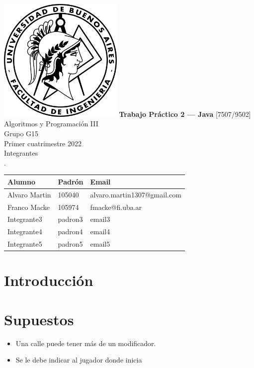 \documentclass[titlepage,a4paper]{article}
\begin{document}
\begin{titlepage} %
	\hfill\includegraphics[width=6cm]{logofiuba.jpg}
    \centering
    \vfill
    \Huge \textbf{Trabajo Práctico 2 — Java}
    \vskip2cm
    \Large [7507/9502] Algoritmos y Programación III\\
    Grupo G15 \\
    Primer cuatrimestre 2022 \\
    \vfill
    Integrantes \\
    .\\
    \begin{tabular}{ | l | l | l | } %
      \hline
      Alumno & Padrón & Email \\ \hline
      Alvaro Martin & 105040 & alvaro.martin1307@gmail.com \\ \hline
      Franco Macke & 105974 & fmacke@fi.uba.ar \\ \hline
      Integrante3 & padron3 & email3 \\ \hline
      Integrante4 & padron4 & email4 \\ \hline
      Integrante5 & padron5 & email5 \\ \hline
  	\end{tabular}
    \vfill
    \vfill
\end{titlepage}

\tableofcontents %
\newpage

\section{Introducción}\label{sec:intro}

\section{Supuestos}\label{sec:supuestos}
  \begin{itemize}
    \item Una calle puede tener más de un modificador.
    \item Se le debe indicar al jugador donde inicia

  \end{itemize}
\end{document}
